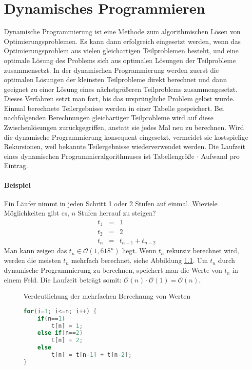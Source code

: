 \chapter{Dynamisches Programmieren}
Dynamische Programmierung ist eine Methode zum algorithmischen Lösen von Optimierungsproblemen.
Es kann dann erfolgreich eingesetzt werden, wenn das Optimierungsproblem aus vielen gleichartigen Teilproblemen besteht,
und eine optimale Lösung des Problems sich aus optimalen Lösungen der Teilprobleme zusammensetzt.
In der dynamischen Programmierung werden zuerst die optimalen Lösungen der kleinsten Teilprobleme direkt berechnet und dann geeignet zu einer Lösung eines nächstgrößeren Teilproblems zusammengesetzt.
Dieses Verfahren setzt man fort, bis das ursprüngliche Problem gelöst wurde.
Einmal berechnete Teilergebnisse werden in einer Tabelle gespeichert.
Bei nachfolgenden Berechnungen gleichartiger Teilprobleme wird auf diese Zwischenlösungen zurückgegriffen, anstatt sie jedes Mal neu zu berechnen.
Wird die dynamische Programmierung konsequent eingesetzt, vermeidet sie kostspielige Rekursionen, weil bekannte Teilergebnisse wiederverwendet werden.
Die Laufzeit eines dynamischen Programmieralgorithmuses ist Tabellengröße \(\cdot\) Aufwand pro Eintrag.

\subsubsection{Beispiel}
Ein Läufer nimmt in jeden Schritt 1 oder 2 Stufen auf einmal.
Wieviele Möglichkeiten gibt es, \(n\) Stufen herrauf zu steigen?
\begin{eqnarray*}
t_{1} &=& 1\\
t_{2} &=& 2\\
t_{n} &=& t_{n-1} + t_{n-2}
\end{eqnarray*}
Man kann zeigen das \(t_{n} \in \mathcal{O}(1,618^{n})\) liegt.
Wenn \(t_{n}\) rekursiv berechnet wird, werden die meisten \(t_{n}\) mehrfach berechnet, siehe Abbildung \ref{fig:ProgLaufer}.
Um \(t_{n}\) durch dynamische Programmierung zu berechnen, speichert man die Werte von \(t_{n}\) in einem Feld.
Die Laufzeit beträgt somit: \(\mathcal{O}(n)\cdot\mathcal{O}(1) = \mathcal{O}(n)\).
\newpage
\begin{figure}[htbp]
	\begin{center}
	\end{center}
	\caption{Verdeutlichung der mehrfachen Berechnung von Werten}
	\label{fig:ProgLaufer}
\end{figure}
\begin{figure}[htbp]
\begin{lstlisting}[language=java, caption={Beispielimplementierung in Java}]
for(i=1; i<=n; i++) {
	if(n==1)
		t[n] = 1;
	else if(n==2)
		t[n] = 2;
	else
		t[n] = t[n-1] + t[n-2];
}
\end{lstlisting}
\end{figure}

